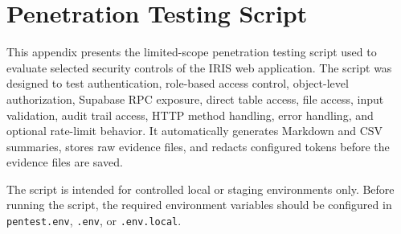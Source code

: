 \chapter{Penetration Testing Script}
\label{app:penetration-testing-script}

This appendix presents the limited-scope penetration testing script used to evaluate selected security controls of the IRIS web application. The script was designed to test authentication, role-based access control, object-level authorization, Supabase RPC exposure, direct table access, file access, input validation, audit trail access, HTTP method handling, error handling, and optional rate-limit behavior. It automatically generates Markdown and CSV summaries, stores raw evidence files, and redacts configured tokens before the evidence files are saved.

The script is intended for controlled local or staging environments only. Before running the script, the required environment variables should be configured in \texttt{pentest.env}, \texttt{.env}, or \texttt{.env.local}.

